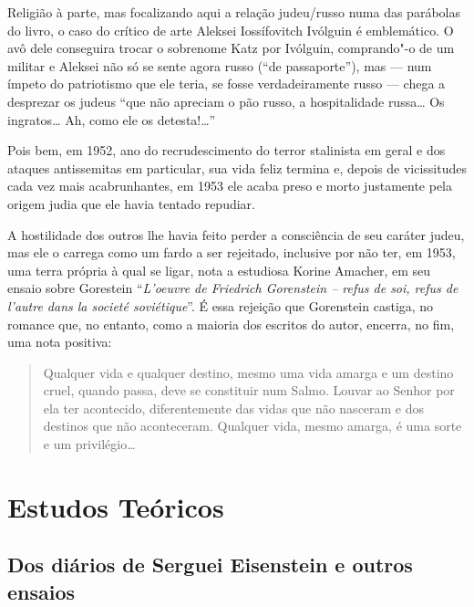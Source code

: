 Religião à parte, mas focalizando aqui a relação judeu/russo numa das
parábolas do livro, o caso do crítico de arte Aleksei Iossífovitch
Ivólguin é emblemático. O avô dele conseguira trocar o sobrenome Katz por
Ivólguin, comprando"-o de um militar e Aleksei não só se sente agora
russo (``de passaporte''), mas --- num ímpeto do patriotismo que ele
teria, se fosse verdadeiramente russo --- chega a desprezar os judeus
``que não apreciam o pão russo, a hospitalidade russa\ldots{} Os ingratos\ldots{}
Ah, como ele os detesta!\ldots{}''

Pois bem, em 1952, ano do recrudescimento do terror stalinista em geral
e dos ataques antissemitas em particular, sua vida feliz termina e,
depois de vicissitudes cada vez mais acabrunhantes, em 1953 ele acaba
preso e morto justamente pela origem judia que ele havia tentado
repudiar.

A hostilidade dos outros lhe havia feito perder a consciência de seu
caráter judeu, mas ele o carrega como um fardo a ser rejeitado,
inclusive por não ter, em 1953, uma terra própria à qual se ligar, nota
a estudiosa Korine Amacher, em seu ensaio sobre Gorestein ``\emph{L'oeuvre de
Friedrich Gorenstein -- refus de soi, refus de l'autre dans la societé
soviétique}''. É essa rejeição que Gorenstein castiga, no romance que, no entanto, como a maioria dos escritos do autor, encerra,
no fim, uma nota positiva: 

\begin{quote}
Qualquer vida e qualquer destino, mesmo uma
vida amarga e um destino cruel, quando passa, deve se constituir num
Salmo. Louvar ao Senhor por ela ter acontecido, diferentemente das vidas
que não nasceram e dos destinos que não aconteceram. Qualquer vida,
mesmo amarga, é uma sorte e um privilégio\ldots{}
\end{quote}

\part{Estudos Teóricos}

\chapter{Dos diários de Serguei Eisenstein e outros ensaios}

